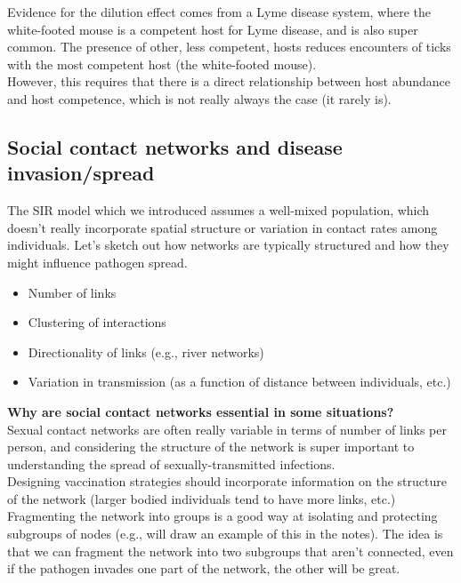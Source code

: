 \documentclass[12pt]{article}
\begin{document}
Evidence for the dilution effect comes from a Lyme disease system, where the white-footed mouse is a competent host for Lyme disease, and is also super common. The presence of other, less competent, hosts reduces encounters of ticks with the most competent host (the white-footed mouse). \\



However, this requires that there is a direct relationship between host abundance and host competence, which is not really always the case (it rarely is).\\








\bigskip

\subsection*{Social contact networks and disease invasion/spread}

The SIR model which we introduced assumes a well-mixed population, which doesn't really incorporate spatial structure or variation in contact rates among individuals. Let's sketch out how networks are typically structured and how they might influence pathogen spread. 


\begin{itemize}
  \item Number of links
  \item Clustering of interactions
  \item Directionality of links (e.g., river networks)
  \item Variation in transmission (as a function of distance between individuals, etc.)
\end{itemize}













\textbf{Why are social contact networks essential in some situations?} \\

Sexual contact networks are often really variable in terms of number of links per person, and considering the structure of the network is super important to understanding the spread of sexually-transmitted infections. \\

Designing vaccination strategies should incorporate information on the structure of the network (larger bodied individuals tend to have more links, etc.) \\


Fragmenting the network into groups is a good way at isolating and protecting subgroups of nodes (e.g., will draw an example of this in the notes). The idea is that we can fragment the network into two subgroups that aren't connected, even if the pathogen invades one part of the network, the other will be great. \\
\end{document}
